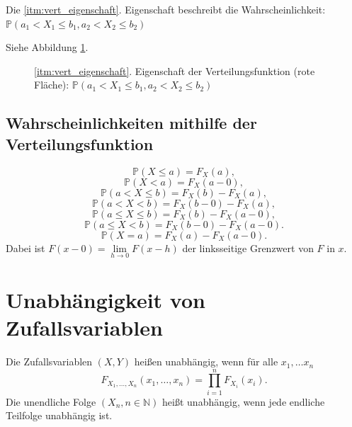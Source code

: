 {    Die \ref{itm:vert_eigenschaft}. Eigenschaft beschreibt die Wahrscheinlichkeit: \\ 
    $\mathbb P\left(a_{1}<X_{1}\le b_{1},a_{2}<X_{2}\leq b_{2}\right)$

    Siehe Abbildung \ref{fig:vert_eigenschaft}.

    \begin{figure}
    \centering
        \begin{tikzpicture}
            
        \end{tikzpicture}
        \caption{\ref{itm:vert_eigenschaft}. Eigenschaft der Verteilungsfunktion (rote Fläche): ${\mathbb{P}(a_1< X_1\leq b_1,a_2<X_2\leq b_2)}$}
        \label{fig:vert_eigenschaft}
    \end{figure}

    \subsection{Wahrscheinlichkeiten mithilfe der Verteilungsfunktion}\label{sec:wahrscheinlichkeiten_verteilungsfunktionen}
    \[\mathbb P(X\le a)=F_X(a),\]
    \[\mathbb P(X<a)=F_X(a-0),\]
    \[\mathbb P(a< X\le b)=F_X(b)-F_X(a),\]
    \[\mathbb P(a< X< b)=F_X(b-0)-F_X(a),\]
    \[\mathbb P(a\le X\le b)=F_X(b)-F_X(a-0),\]
    \[\mathbb P(a\le X< b)=F_X(b-0)-F_X(a-0).\]
    \[\mathbb P( X= a)=F_X(a)-F_X(a-0).\]
    Dabei ist $F(x-0)=\lim\limits_{h\rightarrow 0}F(x-h)$ der linksseitige Grenzwert
    von $F$ in $x$.



    \section{Unabhängigkeit von Zufallsvariablen}

    \begin{definition}\label{def:unabhaengigkeit_verteilung}
        Die Zufallsvariablen $(X,Y)$ heißen unabhängig, wenn für
        alle $x_1,\dots x_n$
        \[F_{X_1,\dots,X_n}(x_1,\dots,x_n)=\prod_{i=1}^nF_{X_i}(x_i).\]
        Die unendliche Folge $(X_n,n\in\mathbb N)$ heißt unabhängig, wenn
        jede endliche Teilfolge unabhängig ist.\\



\end{definition}}
